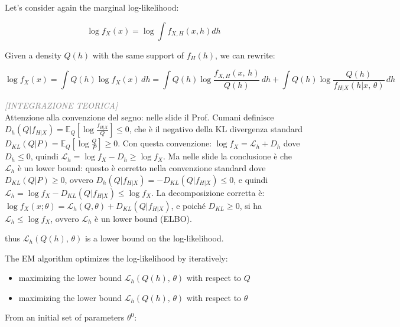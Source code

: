 Let's consider again the marginal log-likelihood:


\begin{equation*}
\log f_X(x) = \log \int f_{X,H}(x,h) dh
\end{equation*}

Given a density $Q(h)$ with the same support of $f_H(h)$, we can rewrite:


\begin{equation*}
\log f_X(x) = \int Q(h)\log f_X(x)\,dh = \int Q(h)\log\frac{f_{X,H}(x,\,h)}{Q(h)}\,dh + \int Q(h)\log\frac{Q(h)}{f_{H|X}(h|x,\,\theta)}\,dh \tag{4}
\end{equation*}

\begin{tcolorbox}[colframe=blue!70!black, colback=white, sharp corners=southwest, left=2mm, boxrule=1pt, enhanced, breakable]
\textcolor{gray}{\footnotesize\textit{[INTEGRAZIONE TEORICA]}}\\
Attenzione alla convenzione del segno: nelle slide il Prof. Cumani definisce $D_h(Q | f_{H|X}) = \mathbb{E}_Q[\log \frac{f_{H|X}}{Q}] \leq 0$, che è il negativo della KL divergenza standard $D_{KL}(Q | P) = \mathbb{E}_Q[\log \frac{Q}{P}] \geq 0$. Con questa convenzione: $\log f_X = \mathcal{L}_h + D_h$ dove $D_h \leq 0$, quindi $\mathcal{L}_h = \log f_X - D_h \geq \log f_X$. Ma nelle slide la conclusione è che $\mathcal{L}_h$ è un lower bound: questo è corretto nella convenzione standard dove $D_{KL}(Q|P) \geq 0$, ovvero $D_h(Q|f_{H|X}) = -D_{KL}(Q|f_{H|X}) \leq 0$, e quindi $\mathcal{L}_h = \log f_X - D_{KL}(Q|f_{H|X}) \leq \log f_X$. La decomposizione corretta è: $\log f_X(x;\theta) = \mathcal{L}_h(Q,\theta) + D_{KL}(Q | f_{H|X})$, e poiché $D_{KL} \geq 0$, si ha $\mathcal{L}_h \leq \log f_X$, ovvero $\mathcal{L}_h$ è un lower bound (ELBO).
\end{tcolorbox}

thus $\mathcal{L}_h(Q(h),\,\theta)$ is a lower bound on the log-likelihood.

The EM algorithm optimizes the log-likelihood by iteratively:
\begin{itemize}
	\item maximizing the lower bound $\mathcal{L}_h(Q(h),\,\theta)$ with respect to $Q$
	\item maximizing the lower bound $\mathcal{L}_h(Q(h),\,\theta)$ with respect to $\theta$
\end{itemize}

From an initial set of parameters $\theta^0$:


